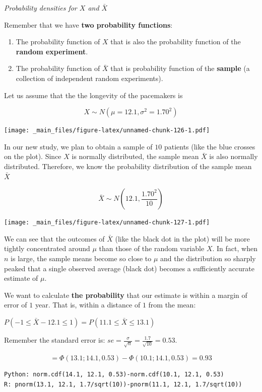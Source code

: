 \documentclass[
]{book}
\begin{document}
\emph{Probability densities for \(X\) and \(\bar{X}\)}

Remember that we have \textbf{two probability functions}:

\begin{enumerate}
\def\labelenumi{\arabic{enumi}.}
\item
  The probability function of \(X\) that is also the probability function of the \textbf{random experiment}.
\item
  The probability function of \(\bar{X}\) that is probability function of the \textbf{sample} (a collection of independent random experiments).
\end{enumerate}

Let us assume that the the longevity of the pacemakers is

\[X \sim N(\mu=12.1, \sigma^2=1.70^2)\]

\texttt{[image: \_main\_files/figure-latex/unnamed-chunk-126-1.pdf]}

In our new study, we plan to obtain a sample of \(10\) patients (like the blue crosses on the plot). Since \(X\) is normally distributed, the sample mean \(\bar{X}\) is also normally distributed. Therefore, we know the probability distribution of the sample mean \(\bar{X}\)

\[\bar{X} \sim N(12.1 , \frac{1.70^2}{10})\]

\texttt{[image: \_main\_files/figure-latex/unnamed-chunk-127-1.pdf]}

We can see that the outcomes of \(\bar{X}\) (like the black dot in the plot) will be more tightly concentrated around \(\mu\) than those of the random variable \(X\). In fact, when \(n\) is large, the sample means become so close to \(\mu\) and the distribution so sharply peaked that a single observed average (black dot) becomes a sufficiently accurate estimate of \(\mu\).

We want to calculate \textbf{the probability} that our estimate is within a margin of error of \(1\) year. That is, within a distance of \(1\) from the mean:

\(P(-1 \leq \bar{X} - 12.1 \leq 1) = P(11.1 \leq \bar{X} \leq 13.1)\)

Remember the standard error is: \(se=\frac{\sigma}{\sqrt{n}}=\frac{1.7}{\sqrt{10}}= 0.53\).

\[=\Phi(13.1; 14.1, 0.53)-\Phi(10.1; 14.1, 0.53)=0.93\]

\begin{verbatim}
Python: norm.cdf(14.1, 12.1, 0.53)-norm.cdf(10.1, 12.1, 0.53)
R: pnorm(13.1, 12.1, 1.7/sqrt(10))-pnorm(11.1, 12.1, 1.7/sqrt(10))
\end{verbatim}
\end{document}
